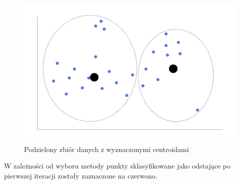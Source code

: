 \documentclass[eng,printmode]{mgr}
\begin{document}
\begin{figure}[H]
  \begin{center}
    \includegraphics[scale=0.5]{kmean_dist_1}
        \caption{Podzielony zbiór danych z wyznaczonymi centroidami}
  \end{center}
\end{figure}
W zależności od wyboru metody punkty sklasyfikowane jako odstające po pierwszej iteracji zostały zaznaczone na czerwono.\\
\end{document}
